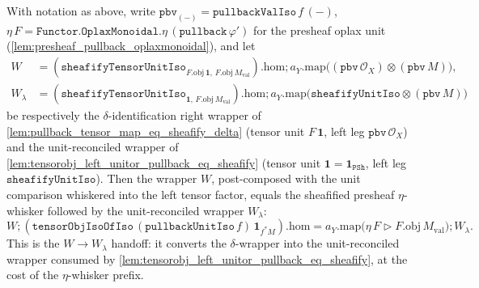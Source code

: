\begin{lemma}\leanok
  \label{lem:pullback_unit_iso_whisker_eq_sheafify_eta_whisker}
  With notation as above, write \(\mathtt{pbv}_{(-)} = \mathtt{pullbackValIso}\,f\,(-)\),
  \(\eta\,F = \mathtt{Functor.OplaxMonoidal.}\eta\,(\mathtt{pullback}\,\varphi')\) for the presheaf
  oplax unit (\cref{lem:presheaf_pullback_oplaxmonoidal}), and let
  \begin{align*}
    W &= (\mathtt{sheafifyTensorUnitIso}_{F.\mathrm{obj}\,\mathbf 1,\,F.\mathrm{obj}\,M_{\mathrm{val}}}).\mathrm{hom}
      \mathbin{;} a_Y.\mathrm{map}\bigl((\mathtt{pbv}\,\mathcal{O}_X)\otimes(\mathtt{pbv}\,M)\bigr),\\
    W_{\lambda} &= (\mathtt{sheafifyTensorUnitIso}_{\mathbf 1,\,F.\mathrm{obj}\,M_{\mathrm{val}}}).\mathrm{hom}
      \mathbin{;} a_Y.\mathrm{map}\bigl(\mathtt{sheafifyUnitIso}\otimes(\mathtt{pbv}\,M)\bigr)
  \end{align*}
  be respectively the \(\delta\)-identification right wrapper of
  \cref{lem:pullback_tensor_map_eq_sheafify_delta} (tensor unit \(F\,\mathbf 1\), left leg
  \(\mathtt{pbv}\,\mathcal{O}_X\)) and the unit-reconciled wrapper of
  \cref{lem:tensorobj_left_unitor_pullback_eq_sheafify} (tensor unit \(\mathbf 1 =
  \mathbf 1_{\mathtt{PSh}}\), left leg \(\mathtt{sheafifyUnitIso}\)). Then the wrapper \(W\),
  post-composed with the unit comparison whiskered into the left tensor factor, equals the sheafified
  presheaf \(\eta\)-whisker followed by the unit-reconciled wrapper \(W_{\lambda}\):
  \[
    W \mathbin{;}
    (\mathtt{tensorObjIsoOfIso}\,(\mathtt{pullbackUnitIso}\,f)\,\mathbf 1_{f^{*}M}).\mathrm{hom}
    = a_Y.\mathrm{map}\bigl(\eta\,F \rhd F.\mathrm{obj}\,M_{\mathrm{val}}\bigr)
      \mathbin{;} W_{\lambda}.
  \]
  This is the \(W \to W_{\lambda}\) handoff: it converts the \(\delta\)-wrapper into the unit-reconciled
  wrapper consumed by \cref{lem:tensorobj_left_unitor_pullback_eq_sheafify}, at the cost of the
  \(\eta\)-whisker prefix.
\end{lemma}
